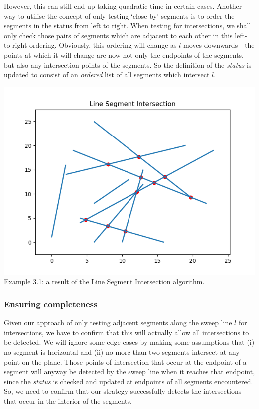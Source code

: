 \documentclass{article}
\begin{document}
However, this can still end up taking quadratic time in certain cases. Another way to utilise the concept of only testing `close by' segments is to order the segments in the status from left to right. When testing for intersections, we shall only check those pairs of segments which are adjacent to each other in this left-to-right ordering. Obviously, this ordering will change as $l$ moves downwards - the points at which it will change are now not only the endpoints of the segments, but also any intersection points of the segments. So the definition of the \emph{status} is updated to consist of an \emph{ordered} list of all segments which intersect $l$.

\begin{center}
    \includegraphics[scale=0.54]{LinSegInt_0}\\
    \tiny{Example 3.1: a result of the Line Segment Intersection algorithm.}
\end{center}

\subsubsection{Ensuring completeness}

Given our approach of only testing adjacent segments along the sweep line $l$ for intersections, we have to confirm that this will actually allow all intersections to be detected. We will ignore some edge cases by making some assumptions that (i) no segment is horizontal and (ii) no more than two segments intersect at any point on the plane. Those points of intersection that occur at the endpoint of a segment will anyway be detected by the sweep line when it reaches that endpoint, since the \emph{status} is checked and updated at endpoints of all segments encountered. So, we need to confirm that our strategy successfully detects the intersections that occur in the interior of the segments.
\end{document}
